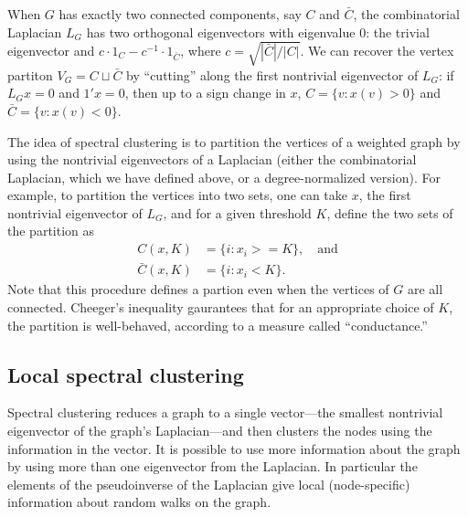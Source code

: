 \documentclass{article}
\begin{document}
When $G$ has exactly two connected components, say $C$ and $\bar C$,
the combinatorial Laplacian $L_G$ has two orthogonal eigenvectors
with eigenvalue $0$: the trivial eigenvector and
$c \cdot 1_C - c^{-1} \cdot 1_{\bar C}$, where
$c = \sqrt{|\bar C| / |C|}$.  We can recover the vertex partiton
$V_G = C \sqcup \bar C$ by ``cutting'' along the first nontrivial
eigenvector of $L_G$: if $L_G x = 0$ and $1' x = 0$, then up to a sign
change in $x$, $C = \{ v : x(v) > 0 \}$ and
$\bar C = \{ v : x(v) < 0 \}$.

The idea of spectral clustering is to partition the vertices of a
weighted graph by using the nontrivial eigenvectors of a Laplacian
(either the combinatorial Laplacian, which we have defined above, or a
degree-normalized version).  For example, to partition the vertices
into two sets, one can take $x$, the first nontrivial eigenvector of
$L_G$, and for a given threshold $K$, define the two sets of the partition as
\begin{align*}
  C(x,K)      &= \{ i : x_i >= K \}, \quad \text{and} \\
  \bar C(x,K) &= \{ i : x_i < K \}.
\end{align*}
Note that this procedure defines a partion even when the vertices of
$G$ are all connected.  Cheeger's inequality gaurantees that for an
appropriate choice of $K$, the partition is well-behaved, according to a
measure called ``conductance.''


\subsection{Local spectral clustering}

Spectral clustering reduces a graph to a single vector---the smallest
nontrivial eigenvector of the graph's Laplacian---and then clusters
the nodes using the information in the vector.  It is possible to use
more information about the graph by using more than one eigenvector
from the Laplacian.  In particular the elements of the pseudoinverse
of the Laplacian give local (node-specific) information about random
walks on the graph.
\end{document}
